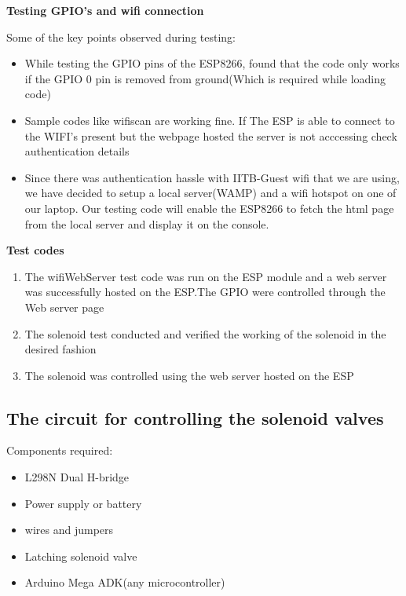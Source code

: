 \documentclass[16pt]{article}
\begin{document}
\vspace{0.5cm}
\textbf{Testing GPIO's and wifi connection}

Some of the key points observed during testing:

\begin{itemize}

\item
  While testing the GPIO pins of the ESP8266, found that the code only
  works if the GPIO 0 pin is removed from ground(Which is required while
  loading code)
\item
  Sample codes like wifiscan are working fine. If The ESP is able to
  connect to the WIFI's present but the webpage hosted the server is not
  acccessing check authentication details
\item
  Since there was authentication hassle with IITB-Guest wifi that we are
  using, we have decided to setup a local server(WAMP) and a wifi
  hotspot on one of our laptop. Our testing code will enable the ESP8266
  to fetch the html page from the local server and display it on the
  console.
  
\end{itemize}

\vspace{0.5cm}

\textbf{Test codes}

\begin{enumerate}

\item
  The wifiWebServer test code was run on the ESP module and a web server
  was successfully hosted on the ESP.The GPIO were controlled through
  the Web server page
\item
  The solenoid test conducted and verified the working of the solenoid
  in the desired fashion
\item
  The solenoid was controlled using the web server hosted on the ESP
\end{enumerate}

\vspace{0.5cm}

\subsection{The circuit for controlling the solenoid valves}

Components required:

\begin{itemize}

\item
  L298N Dual H-bridge
\item
  Power supply or battery
\item
  wires and jumpers
\item
  Latching solenoid valve
\item
  Arduino Mega ADK(any microcontroller)
\end{itemize}
\end{document}
